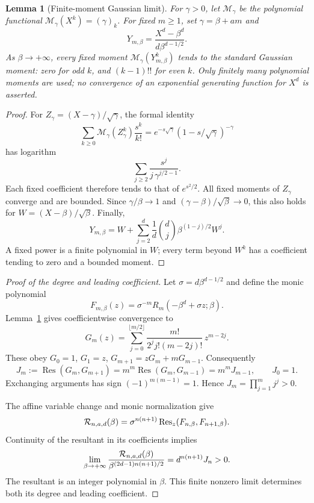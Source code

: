 \documentclass[11pt]{article}
\newtheorem{lemma}[theorem]{Lemma}
\newcommand{\Res}{\operatorname{Res}}
\begin{document}
\begin{lemma}[Finite-moment Gaussian limit]\label{lem:Gaussian}
For $\gamma>0$, let $\mathcal M_\gamma$ be the polynomial functional
$\mathcal M_\gamma(X^k)=(\gamma)_k$.
For fixed $m\ge1$, set $\gamma=\beta+am$ and
\[
 Y_{m,\beta}=\frac{X^d-\beta^d}{d\beta^{d-1/2}}.
\]
As $\beta\to+\infty$, every fixed moment
$\mathcal M_\gamma(Y_{m,\beta}^k)$ tends to the standard Gaussian
moment: zero for odd $k$, and $(k-1)!!$ for even $k$.
Only finitely many polynomial moments are used; no convergence of an
exponential generating function for $X^d$ is asserted.
\end{lemma}
\begin{proof}
For $Z_\gamma=(X-\gamma)/\sqrt\gamma$, the formal identity
\[
 \sum_{k\ge0}\mathcal M_\gamma(Z_\gamma^k)\frac{s^k}{k!}
 =e^{-s\sqrt\gamma}(1-s/\sqrt\gamma)^{-\gamma}
\]
has logarithm
\[
 \sum_{j\ge2}\frac{s^j}{j\,\gamma^{j/2-1}}.
\]
Each fixed coefficient therefore tends to that of $e^{s^2/2}$.
All fixed moments of $Z_\gamma$ converge and are bounded.
Since $\gamma/\beta\to1$ and
$(\gamma-\beta)/\sqrt\beta\to0$, this also holds for
$W=(X-\beta)/\sqrt\beta$.
Finally,
\[
 Y_{m,\beta}
 =W+\sum_{j=2}^d\frac1d\binom dj\beta^{(1-j)/2}W^j.
\]
A fixed power is a finite polynomial in $W$; every term beyond
$W^k$ has a coefficient tending to zero and a bounded moment.
\end{proof}

\begin{proof}[Proof of the degree and leading coefficient]
Let $\sigma=d\beta^{d-1/2}$ and define the monic polynomial
\[
 F_{m,\beta}(z)=\sigma^{-m}R_m(-\beta^d+\sigma z;\beta).
\]
Lemma~\ref{lem:Gaussian} gives coefficientwise convergence to
\[
 G_m(z)=\sum_{j=0}^{\lfloor m/2\rfloor}
        \frac{m!}{2^j j!(m-2j)!}\,z^{m-2j}.
\]
These obey $G_0=1$, $G_1=z$,
$G_{m+1}=zG_m+mG_{m-1}$. Consequently
\[
 J_m:=\Res(G_m,G_{m+1})
 =m^m\Res(G_m,G_{m-1})
 =m^mJ_{m-1},\qquad J_0=1.
\]
Exchanging arguments has sign $(-1)^{m(m-1)}=1$.
Hence $J_m=\prod_{j=1}^m j^j>0$.

The affine variable change and monic normalization give
\[
 {\cal R}_{n,a,d}(\beta)
 =\sigma^{n(n+1)}
       \Res_z(F_{n,\beta},F_{n+1,\beta}).
\]
Continuity of the resultant in its coefficients implies
\[
 \lim_{\beta\to+\infty}
 \frac{{\cal R}_{n,a,d}(\beta)}
      {\beta^{(2d-1)n(n+1)/2}}
 =d^{n(n+1)}J_n>0.
\]
The resultant is an integer polynomial in $\beta$. This finite
nonzero limit determines both its degree and leading coefficient.
\end{proof}
\end{document}
